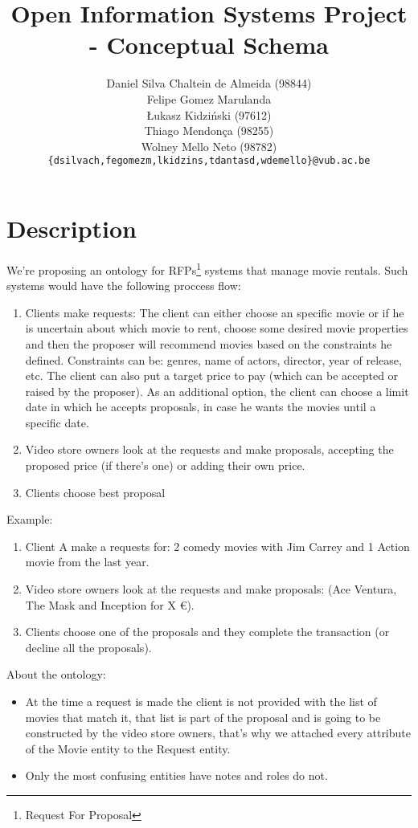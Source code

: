 \documentclass[a4paper,10pt]{article}
\title{Open Information Systems Project - Conceptual Schema}
\author{Daniel Silva Chaltein de Almeida (98844)\\
Felipe Gomez Marulanda\\
Łukasz Kidziński (97612)\\
Thiago Mendonça (98255)\\
Wolney Mello Neto (98782)\\
\texttt{\{{}dsilvach,fegomezm,lkidzins,tdantasd,wdemello\}@vub.ac.be}}
\begin{document}
\maketitle

\section{Description}

We're proposing an ontology for RFPs\footnote{Request For Proposal} systems that manage movie rentals. Such systems would have the following proccess flow:
\begin{enumerate}
  \item Clients make requests: The client can either choose an specific movie or if he is uncertain about which movie to rent, choose some desired movie properties and then the proposer will recommend movies based on the constraints he defined.
    \subitem Constraints can be: genres, name of actors, director, year of release, etc.
    \subitem The client can also put a target price to pay (which can be accepted or raised by the proposer).
    \subitem As an additional option, the client can choose a limit date in which he accepts proposals, in case he wants the movies until a specific date.
  \item Video store owners look at the requests and make proposals, accepting the proposed price (if there's one) or adding their own price.
  \item Clients choose best proposal
\end{enumerate}

Example:
\begin{enumerate}
  \item Client A make a requests for: 2 comedy movies with Jim Carrey and 1 Action movie from the last year.
  \item Video store owners look at the requests and make proposals: (Ace Ventura, The Mask and Inception for X \euro).
  \item Clients choose one of the proposals and they complete the transaction (or decline all the proposals).
\end{enumerate}

About the ontology:
\begin{itemize}
  \item At the time a request is made the client is not provided with the list of movies that match it, that list is part of the proposal and is going to be constructed by the video store owners, that's why we attached every attribute of the Movie entity to the Request entity.
  \item Only the most confusing entities have notes and roles do not.
\end{itemize}
\end{document}
